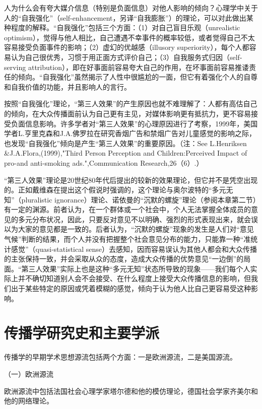 \documentclass[UTF8,12pt]{ctexart}
\numberwithin{equation}{section} %
\numberwithin{figure}{section}
\numberwithin{table}{section}
\begin{document}
	人为什么会有夸大媒介信息（特别是负面信息）对他人影响的倾向？心理学中关于人的“自我强化”（self-enhancement，另译“自我膨胀”）的理论，可以对此做出某种程度的解释。“自我强化”包括三个方面：（1）对自己盲目乐观（unrealistic optimism），觉得与他人相比，自己遭遇不幸事件的概率较低，或者觉得自己不太容易接受负面事件的影响；（2）虚幻的优越感（illusory superiority），每个人都容易认为自己很优秀，习惯于用正面方式评价自己；（3）自我服务式归因（self-serving attribution），即在好事面前容易夸大自己的作用，在坏事面前容易推诿责任的倾向。“自我强化”虽然揭示了人性中很尴尬的一面，但它有着强化个人的自尊和自我价值的功能，并且影响人的言行。
	
	按照“自我强化”理论，“第三人效果”的产生原因也就不难理解了：人都有高估自己的倾向，在大众传播面前认为自己更有主见，对媒体影响更有抵抗力，更不容易接受负面信息影响。许多学者对“第三人效果”的心理原因进行了考察，1999年，美国学者L.亨里克森和J.A.佛罗拉在研究香烟广告和禁烟广告对儿童感觉的影响之际，也发现“自我强化”倾向是产生“第三人效果”的重要原因。（注：See L.Henriksen \&J.A.Flora,(1999),"Third Person Perception and Children:Perceived Impact of pro-and anti-smoking ads.",Communication Research,26（6）.）
	
	“第三人效果”理论是20世纪80年代后提出的较新的效果理论，但它并不是凭空出现的。正如戴维森在提出这个假说时强调的，这个理论与奥尔波特的“多元无知”（pluralistic ignorance）理论、诺依曼的“沉默的螺旋”理论（参阅本章第二节）有一定的渊源。前者认为，在一个群体或一个社会中，个人无法掌握全体成员的意见的多元分布状况，因此，只要反对意见不以明确、强烈的形式表现出来，就会误以为大家的意见都是一致的。后者认为，“沉默的螺旋”现象的发生是人们对“意见气候”判断的结果，而个人并没有把握整个社会意见分布的能力，只能靠一种“准统计感觉”（quasi-statistical sense）去感知，因而容易误认为其他人都会和大众传播的主张保持一致，并会采取从众的态度，造成大众传播的优势意见“一边倒”的局面。“第三人效果”实际上也是这种“多元无知”状态所导致的现象——我们每个人实际上并不确切知道别人会不会接受、在什么程度上接受大众传播信息的影响，但我们出于某些特定的原因或凭着模糊的感觉，倾向于认为他人比自己更容易受这种影响。
	
	\newpage
	
	\section{传播学研究史和主要学派}
	传播学的早期学术思想源流包括两个方面：一是欧洲源流，二是美国源流。
	
	（一）欧洲源流
	
	欧洲源流中包括法国社会心理学家塔尔德和他的模仿理论，德国社会学家齐美尔和他的网络理论。
	
\end{document}

